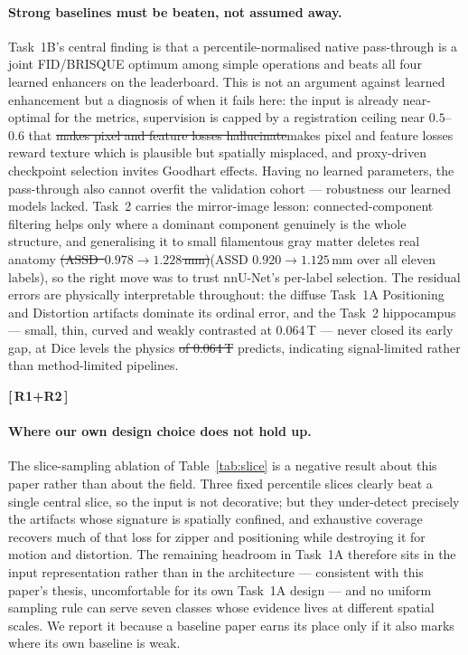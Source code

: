 \documentclass[runningheads]{llncs}
\newcommand{\addone}[1]{\textcolor{revone}{#1}}
\newcommand{\delone}[1]{\textcolor{revone}{\sout{#1}}}
\newcommand{\addtwo}[1]{\textcolor{revtwo}{#1}}
\newcommand{\deltwo}[1]{\textcolor{revtwo}{\sout{#1}}}
\newcommand{\delself}[1]{\textcolor{revself}{\sout{#1}}}
\newenvironment{revblock}[2]{\par\color{#1}\noindent\textbf{[\,#2\,]}\ \ignorespaces}{\par}
\begin{document}
\paragraph{Strong baselines must be beaten, not assumed away.}
Task~1B's central finding is that a percentile-normalised native pass-through is a
joint FID/BRISQUE optimum among simple operations and beats all four learned
enhancers on the leaderboard. This is not an argument against learned enhancement
but a diagnosis of when it fails here: the input is already near-optimal for the
metrics, supervision is capped by a registration ceiling near $0.5$--$0.6$ that
\deltwo{makes pixel and feature losses hallucinate}\addtwo{makes pixel
and feature losses reward texture which is plausible but spatially misplaced}, and
proxy-driven checkpoint selection
invites Goodhart effects. Having no learned parameters, the pass-through also
cannot overfit the validation cohort --- robustness our learned models lacked.
Task~2 carries the mirror-image lesson: connected-component filtering helps only
where a dominant component genuinely is the whole structure, and generalising it
to small filamentous gray matter deletes real anatomy
\delone{\mbox{(ASSD $0.978\to1.228$\,mm)}}\addone{(ASSD $0.920\!\to\!1.125$\,mm over
all eleven labels)}, so the right move was to trust nnU-Net's per-label selection. The residual errors are physically interpretable throughout: the
diffuse Task~1A Positioning and Distortion artifacts dominate its ordinal error,
and the Task~2 hippocampus --- small, thin, curved and weakly contrasted at
0.064\,T --- never closed its early gap, at Dice levels the physics
\delself{of 0.064\,T} predicts, indicating signal-limited rather than method-limited
pipelines.

\begin{revblock}{revboth}{R1+R2}
\paragraph{Where our own design choice does not hold up.}
The slice-sampling ablation of Table~\ref{tab:slice} is a negative result about this
paper rather than about the field. Three fixed percentile slices clearly beat a single
central slice, so the input is not decorative; but they under-detect precisely the
artifacts whose signature is spatially confined, and exhaustive coverage recovers much
of that loss for zipper and positioning while destroying it for motion and distortion.
The remaining headroom in Task~1A therefore sits in the input representation rather
than in the architecture --- consistent with this paper's thesis, uncomfortable for its
own Task~1A design --- and no uniform sampling rule can serve seven classes whose
evidence lives at different spatial scales. We report it because a baseline paper earns
its place only if it also marks where its own baseline is weak.

\end{revblock}
\end{document}
